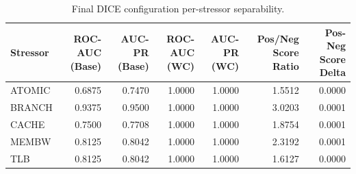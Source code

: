 \begin{table}[t]
\centering
\caption{Final DICE configuration per-stressor separability.}
\label{tab:dice_full_stressor}
\footnotesize
\begin{tabular}{lrrrrrr}
\toprule
Stressor & ROC-AUC (Base) & AUC-PR (Base) & ROC-AUC (WC) & AUC-PR (WC) & Pos/Neg Score Ratio & Pos-Neg Score Delta \\
\midrule
ATOMIC & 0.6875 & 0.7470 & 1.0000 & 1.0000 & 1.5512 & 0.0000 \\
BRANCH & 0.9375 & 0.9500 & 1.0000 & 1.0000 & 3.0203 & 0.0001 \\
CACHE & 0.7500 & 0.7708 & 1.0000 & 1.0000 & 1.8754 & 0.0001 \\
MEMBW & 0.8125 & 0.8042 & 1.0000 & 1.0000 & 2.3192 & 0.0001 \\
TLB & 0.8125 & 0.8042 & 1.0000 & 1.0000 & 1.6127 & 0.0000 \\
\bottomrule
\end{tabular}

\end{table}
